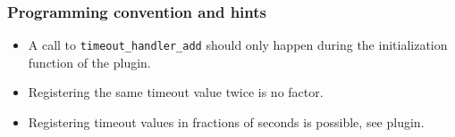 \documentclass[documentation]{subfiles}
\begin{document}
\subsubsection{Programming convention and hints}
\begin{itemize}
    \item A call to {\tt timeout\_handler\_add} should only happen during the initialization function of the plugin.
    \item Registering the same timeout value twice is no factor.
    \item Registering timeout values in fractions of seconds is possible, see  plugin.
\end{itemize}
\end{document}
